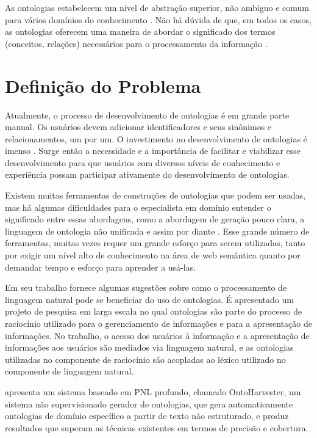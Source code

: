 \documentclass{bcc}
\begin{document}
As ontologias estabelecem um nível de abstração superior, não ambíguo e comum para vários domínios do conhecimento \cite{rocha2014}. Não há dúvida de que, em todos os casos, as ontologias oferecem uma maneira de abordar o significado dos termos (conceitos, relações) necessários para o processamento da informação \cite{estival2004}.

\section{Definição do Problema}

Atualmente, o processo de desenvolvimento de ontologias é em grande parte manual. Os usuários devem adicionar identificadores e seus sinônimos e relacionamentos, um por um. O investimento no desenvolvimento de ontologias é imenso \cite{liu2011}. Surge então a necessidade e a importância de facilitar e viabilizar esse desenvolvimento para que usuários com diversos níveis de conhecimento e experiência possam participar ativamente do desenvolvimento de ontologias.

Existem muitas ferramentas de construções de ontologias que podem ser usadas, mas há algumas dificuldades para o especialista em domínio entender o significado entre essas abordagens, como a abordagem de geração pouco clara, a linguagem de ontologia não unificada e assim por diante \cite{zhou2010}. Esse grande número de ferramentas, muitas vezes requer um grande esforço para serem utilizadas, tanto por exigir um nível alto de conhecimento na área de web semântica quanto por demandar tempo e esforço para aprender a usá-las.

Em seu trabalho \cite{estival2004} fornece algumas sugestões sobre como o processamento de linguagem natural pode se beneficiar do uso de ontologias. É apresentado um projeto de pesquisa em larga escala no qual ontologias são parte do processo de raciocínio utilizado para o gerenciamento de informações e para a apresentação de informações. No trabalho, o acesso dos usuários à informação e a apresentação de informações aos usuários são mediados via linguagem natural, e as ontologias utilizadas no componente de raciocínio são acopladas ao léxico utilizado no componente de linguagem natural.

\cite{mousavi2013} apresenta um sistema baseado em PNL profundo, chamado OntoHarvester, um sistema não supervisionado gerador de ontologias, que gera automaticamente ontologias de domínio específico a partir de texto não estruturado, e produz resultados que superam as técnicas existentes em termos de precisão e cobertura.
\end{document}

